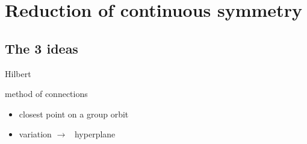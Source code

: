 

\section{Reduction of continuous symmetry}
\label{s:slice}

\subsection{The 3 ideas}

 Hilbert

 method of connections

 \mslices

    \begin{itemize}
      \item closest point on a group orbit
      \item variation $\to$ \slice\ hyperplane
    \end{itemize}



